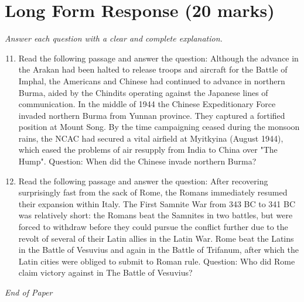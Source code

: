 \documentclass[12pt]{article}
\begin{document}
\section*{Long Form Response (20 marks)}
\textit{Answer each question with a clear and complete explanation.}
\begin{enumerate}[label=\arabic*.]
\setcounter{enumi}{10}
\item Read the following passage and answer the question: Although the advance in the Arakan had been halted to release troops and aircraft for the Battle of Imphal, the Americans and Chinese had continued to advance in northern Burma, aided by the Chindits operating against the Japanese lines of communication. In the middle of 1944 the Chinese Expeditionary Force invaded northern Burma from Yunnan province. They captured a fortified position at Mount Song. By the time campaigning ceased during the monsoon rains, the NCAC had secured a vital airfield at Myitkyina (August 1944), which eased the problems of air resupply from India to China over "The Hump". Question: When did the Chinese invade northern Burma?
\item Read the following passage and answer the question: After recovering surprisingly fast from the sack of Rome, the Romans immediately resumed their expansion within Italy. The First Samnite War from 343 BC to 341 BC was relatively short: the Romans beat the Samnites in two battles, but were forced to withdraw before they could pursue the conflict further due to the revolt of several of their Latin allies in the Latin War. Rome beat the Latins in the Battle of Vesuvius and again in the Battle of Trifanum, after which the Latin cities were obliged to submit to Roman rule. Question: Who did Rome claim victory against in The Battle of Vesuvius?
\end{enumerate}

\vfill
\noindent\textit{End of Paper}
\end{document}
